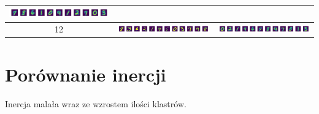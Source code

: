 \begin{tabular}{ |c|c|c| }
        \includegraphics[width=0.45\linewidth]{../results/11-clusters/centroids_end.png} \\
    \hline
        12 & 
        \includegraphics[width=0.45\linewidth]{../results/12-clusters/centroids_start.png} &
        \includegraphics[width=0.45\linewidth]{../results/12-clusters/centroids_end.png} \\
    \hline
\end{tabular}

\vspace{2cm}

\section*{Porównanie inercji}
Inercja malała wraz ze wzrostem ilości klastrów.\\

\begin{center}
\end{center}
